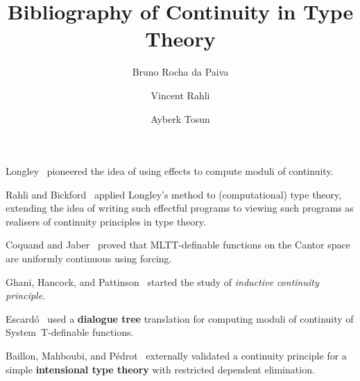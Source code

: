 \documentclass[a4paper]{article}
\title{Bibliography of Continuity in Type Theory}
\author{Bruno Rocha da Paiva \and Vincent Rahli \and Ayberk Tosun}
\begin{document}
\maketitle

Longley~\cite{longley-not-a-functional-program-1999} pioneered the idea of using
effects to compute moduli of continuity.

Rahli and Bickford~\cite{rahli-bickford-mscs-2018} applied Longley's method to
(computational) type theory, extending the idea of writing such effectful
programs to viewing such programs as realisers of continuity principles in type
theory.

Coquand and Jaber~\cite{coq-jaber-forcing-2012} proved that MLTT-definable
functions on the Cantor space are uniformly continuous using forcing.

Ghani, Hancock, and Pattinson~\cite{ghp-continuous-functions-2006} started the
study of \emph{inductive continuity principle}.

Escard\'o~\cite{mhe-effectful-forcing-2013} used a \textbf{dialogue tree}
translation for computing moduli of continuity of System~T-definable functions.

Baillon, Mahboubi, and P\'edrot~\cite{bmp-pythia-2022} externally validated a
continuity principle for a simple \textbf{intensional type theory} with
restricted dependent elimination.

\newpage
\printbibliography
\end{document}
